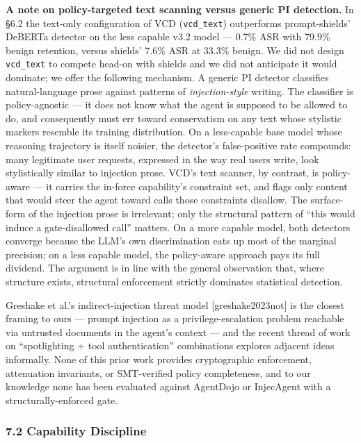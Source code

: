 \textbf{A note on policy-targeted text scanning versus generic PI
detection.} In §6.2 the text-only configuration of VCD
(\texttt{vcd\_text}) outperforms prompt-shields' DeBERTa detector on the
less capable v3.2 model --- 0.7\% ASR with 79.9\% benign retention,
versus shields' 7.6\% ASR at 33.3\% benign. We did not design
\texttt{vcd\_text} to compete head-on with shields and we did not
anticipate it would dominate; we offer the following mechanism. A
generic PI detector classifies natural-language prose against patterns
of \emph{injection-style} writing. The classifier is policy-agnostic ---
it does not know what the agent is supposed to be allowed to do, and
consequently must err toward conservatism on any text whose stylistic
markers resemble its training distribution. On a less-capable base model
whose reasoning trajectory is itself noisier, the detector's
false-positive rate compounds: many legitimate user requests, expressed
in the way real users write, look stylistically similar to injection
prose. VCD's text scanner, by contrast, is policy-aware --- it carries
the in-force capability's constraint set, and flags only content that
would steer the agent toward calls those constraints disallow. The
surface-form of the injection prose is irrelevant; only the structural
pattern of ``this would induce a gate-disallowed call'' matters. On a
more capable model, both detectors converge because the LLM's own
discrimination eats up most of the marginal precision; on a less capable
model, the policy-aware approach pays its full dividend. The argument is
in line with the general observation that, where structure exists,
structural enforcement strictly dominates statistical detection.

Greshake et al.'s indirect-injection threat model {[}greshake2023not{]}
is the closest framing to ours --- prompt injection as a
privilege-escalation problem reachable via untrusted documents in the
agent's context --- and the recent thread of work on ``spotlighting +
tool authentication'' combinations explores adjacent ideas informally.
None of this prior work provides cryptographic enforcement, attenuation
invariants, or SMT-verified policy completeness, and to our knowledge
none has been evaluated against AgentDojo or InjecAgent with a
structurally-enforced gate.

\subsubsection{7.2 Capability Discipline}\label{capability-discipline}

